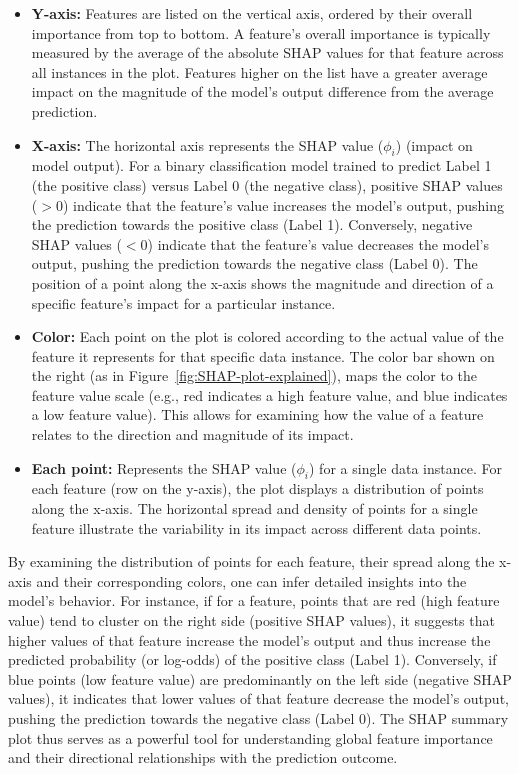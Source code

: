\documentclass[12pt,a4paper]{report}
\begin{document}
\begin{itemize}
    \item \textbf{Y-axis:} Features are listed on the vertical axis, ordered by their overall importance from top to bottom. A feature's overall importance is typically measured by the average of the absolute SHAP values for that feature across all instances in the plot. Features higher on the list have a greater average impact on the magnitude of the model's output difference from the average prediction.
    \item \textbf{X-axis:} The horizontal axis represents the SHAP value ($\phi_i$) (impact on model output). For a binary classification model trained to predict Label 1 (the positive class) versus Label 0 (the negative class), positive SHAP values ($>0$) indicate that the feature's value increases the model's output, pushing the prediction towards the positive class (Label 1). Conversely, negative SHAP values ($<0$) indicate that the feature's value decreases the model's output, pushing the prediction towards the negative class (Label 0). The position of a point along the x-axis shows the magnitude and direction of a specific feature's impact for a particular instance.
    \item \textbf{Color:} Each point on the plot is colored according to the actual value of the feature it represents for that specific data instance. The color bar shown on the right (as in Figure~\ref{fig:SHAP-plot-explained}), maps the color to the feature value scale (e.g., red indicates a high feature value, and blue indicates a low feature value). This allows for examining how the value of a feature relates to the direction and magnitude of its impact.
    \item \textbf{Each point:} Represents the SHAP value ($\phi_i$) for a single data instance. For each feature (row on the y-axis), the plot displays a distribution of points along the x-axis. The horizontal spread and density of points for a single feature illustrate the variability in its impact across different data points.
\end{itemize}
By examining the distribution of points for each feature, their spread along the x-axis and their corresponding colors, one can infer detailed insights into the model's behavior. For instance, if for a feature, points that are red (high feature value) tend to cluster on the right side (positive SHAP values), it suggests that higher values of that feature increase the model's output and thus increase the predicted probability (or log-odds) of the positive class (Label 1). Conversely, if blue points (low feature value) are predominantly on the left side (negative SHAP values), it indicates that lower values of that feature decrease the model's output, pushing the prediction towards the negative class (Label 0). The SHAP summary plot thus serves as a powerful tool for understanding global feature importance and their directional relationships with the prediction outcome.
\end{document}
